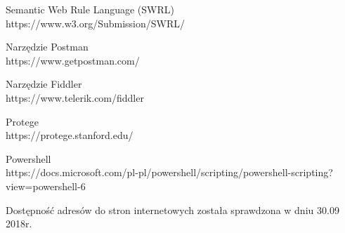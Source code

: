 \begin{thebibliography}{1}
Semantic Web Rule Language (SWRL)
\\
https://www.w3.org/Submission/SWRL/

Narzędzie Postman
\\
https://www.getpostman.com/


Narzędzie Fiddler
\\
https://www.telerik.com/fiddler

 Protege
\\
https://protege.stanford.edu/

 Powershell
\\
https://docs.microsoft.com/pl-pl/powershell/scripting/powershell-scripting?view=powershell-6

\end{thebibliography}

Dostępność adresów do stron internetowych została sprawdzona w dniu 30.09 2018r.